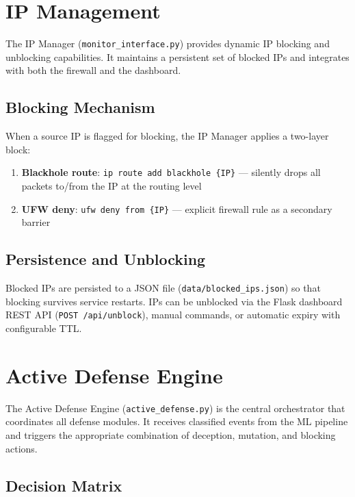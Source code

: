 \documentclass[12pt,a4paper]{report}
\begin{document}
\section{IP Management}

The IP Manager (\texttt{monitor\_interface.py}) provides dynamic IP blocking and unblocking capabilities. It maintains a persistent set of blocked IPs and integrates with both the firewall and the dashboard.

\subsection{Blocking Mechanism}

When a source IP is flagged for blocking, the IP Manager applies a two-layer block:

\begin{enumerate}
    \item \textbf{Blackhole route}: \texttt{ip route add blackhole \{IP\}} --- silently drops all packets to/from the IP at the routing level
    \item \textbf{UFW deny}: \texttt{ufw deny from \{IP\}} --- explicit firewall rule as a secondary barrier
\end{enumerate}

\subsection{Persistence and Unblocking}

Blocked IPs are persisted to a JSON file (\texttt{data/blocked\_ips.json}) so that blocking survives service restarts. IPs can be unblocked via the Flask dashboard REST API (\texttt{POST /api/unblock}), manual commands, or automatic expiry with configurable TTL.

\section{Active Defense Engine}

The Active Defense Engine (\texttt{active\_defense.py}) is the central orchestrator that coordinates all defense modules. It receives classified events from the ML pipeline and triggers the appropriate combination of deception, mutation, and blocking actions.

\subsection{Decision Matrix}
\end{document}
